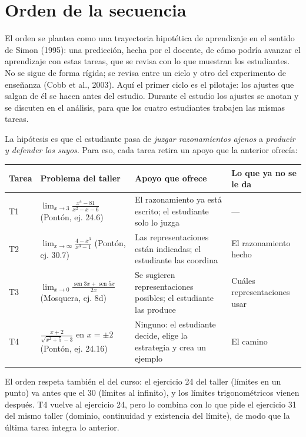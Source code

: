 \documentclass[11pt,letterpaper]{article}
\DeclareMathOperator{\seno}{sen}
\begin{document}
\section{Orden de la secuencia}

El orden se plantea como una trayectoria hipotética de aprendizaje en el sentido de Simon (1995): una predicción, hecha por el docente, de cómo podría avanzar el aprendizaje con estas tareas, que se revisa con lo que muestran los estudiantes. No se sigue de forma rígida; se revisa entre un ciclo y otro del experimento de enseñanza (Cobb et al., 2003). Aquí el primer ciclo es el pilotaje: los ajustes que salgan de él se hacen antes del estudio. Durante el estudio los ajustes se anotan y se discuten en el análisis, para que los cuatro estudiantes trabajen las mismas tareas.

La hipótesis es que el estudiante pasa de \emph{juzgar razonamientos ajenos} a \emph{producir y defender los suyos}. Para eso, cada tarea retira un apoyo que la anterior ofrecía:

\begin{center}\small
\renewcommand{\arraystretch}{1.3}
\begin{tabularx}{\linewidth}{@{}p{1cm}p{3.6cm}LL@{}}
\toprule
\textbf{Tarea} & \textbf{Problema del taller} & \textbf{Apoyo que ofrece} & \textbf{Lo que ya no se le da} \\
\midrule
T1 & $\lim_{x\to3}\frac{x^4-81}{x^2-x-6}$ (Pontón, ej. 24.6) & El razonamiento ya está escrito; el estudiante solo lo juzga & --- \\
T2 & $\lim_{x\to\infty}\frac{4-x^3}{x^3-1}$ (Pontón, ej. 30.7) & Las representaciones están indicadas; el estudiante las coordina & El razonamiento hecho \\
T3 & $\lim_{x\to0}\frac{\seno 3x+\seno 5x}{2x}$ (Mosquera, ej. 8d) & Se sugieren representaciones posibles; el estudiante las produce & Cuáles representaciones usar \\
T4 & $\frac{x+2}{\sqrt{x^2+5}-3}$ en $x=\pm2$ (Pontón, ej. 24.16) & Ninguno: el estudiante decide, elige la estrategia y crea un ejemplo & El camino \\
\bottomrule
\end{tabularx}
\end{center}

El orden respeta también el del curso: el ejercicio 24 del taller (límites en un punto) va antes que el 30 (límites al infinito), y los límites trigonométricos vienen después. T4 vuelve al ejercicio 24, pero lo combina con lo que pide el ejercicio 31 del mismo taller (dominio, continuidad y existencia del límite), de modo que la última tarea integra lo anterior.
\end{document}
